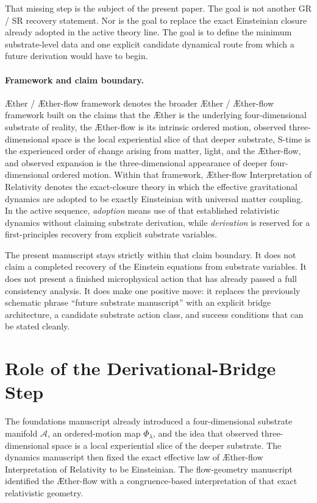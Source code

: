 \documentclass[11pt]{article}
\newcommand{\Aether}{\AE{}ther}
\newcommand{\Aflow}{\AE{}ther-flow}
\newcommand{\TheoryName}{\Aflow{} Interpretation of Relativity}
\newcommand{\TheoryProgram}{\Aether{} / \Aflow{} framework}
\newcommand{\Sub}{\mathcal{A}}
\begin{document}
That missing step is the subject of the present paper. The goal is not another GR / SR recovery statement. Nor is the goal to replace the exact Einsteinian closure already adopted in the active theory line. The goal is to define the minimum substrate-level data and one explicit candidate dynamical route from which a future derivation would have to begin.

\paragraph{Framework and claim boundary.}
\TheoryProgram{} denotes the broader \Aether{} / \Aflow{} framework built on the claims that the \Aether{} is the underlying four-dimensional substrate of reality, the \Aflow{} is its intrinsic ordered motion, observed three-dimensional space is the local experiential slice of that deeper substrate, S-time is the experienced order of change arising from matter, light, and the \Aflow{}, and observed expansion is the three-dimensional appearance of deeper four-dimensional ordered motion. Within that framework, \TheoryName{} denotes the exact-closure theory in which the effective gravitational dynamics are adopted to be exactly Einsteinian with universal matter coupling. In the active sequence, \emph{adoption} means use of that established relativistic dynamics without claiming substrate derivation, while \emph{derivation} is reserved for a first-principles recovery from explicit substrate variables.

The present manuscript stays strictly within that claim boundary. It does not claim a completed recovery of the Einstein equations from substrate variables. It does not present a finished microphysical action that has already passed a full consistency analysis. It does make one positive move: it replaces the previously schematic phrase ``future substrate manuscript'' with an explicit bridge architecture, a candidate substrate action class, and success conditions that can be stated cleanly.

\section{Role of the Derivational-Bridge Step}

The foundations manuscript already introduced a four-dimensional substrate manifold \(\Sub\), an ordered-motion map \(\Phi_\lambda\), and the idea that observed three-dimensional space is a local experiential slice of the deeper substrate. The dynamics manuscript then fixed the exact effective law of \TheoryName{} to be Einsteinian. The flow-geometry manuscript identified the \Aflow{} with a congruence-based interpretation of that exact relativistic geometry.
\end{document}
